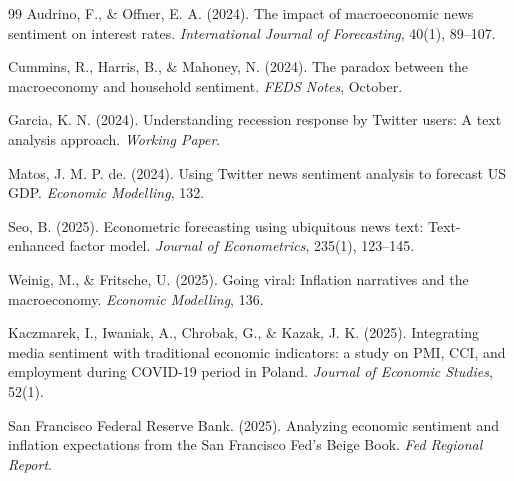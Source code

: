 \documentclass[11pt]{article}
\begin{document}
\begin{thebibliography}{99}
 Audrino, F., \& Offner, E. A. (2024). The impact of macroeconomic news sentiment on interest rates. \textit{International Journal of Forecasting}, 40(1), 89--107.

 Cummins, R., Harris, B., \& Mahoney, N. (2024). The paradox between the macroeconomy and household sentiment. \textit{FEDS Notes}, October.

 Garcia, K. N. (2024). Understanding recession response by Twitter users: A text analysis approach. \textit{Working Paper}.

 Matos, J. M. P. de. (2024). Using Twitter news sentiment analysis to forecast US GDP. \textit{Economic Modelling}, 132.

 Seo, B. (2025). Econometric forecasting using ubiquitous news text: Text-enhanced factor model. \textit{Journal of Econometrics}, 235(1), 123--145.

 Weinig, M., \& Fritsche, U. (2025). Going viral: Inflation narratives and the macroeconomy. \textit{Economic Modelling}, 136.

 Kaczmarek, I., Iwaniak, A., Chrobak, G., \& Kazak, J. K. (2025). Integrating media sentiment with traditional economic indicators: a study on PMI, CCI, and employment during COVID-19 period in Poland. \textit{Journal of Economic Studies}, 52(1).

 San Francisco Federal Reserve Bank. (2025). Analyzing economic sentiment and inflation expectations from the San Francisco Fed's Beige Book. \textit{Fed Regional Report}.

\end{thebibliography}
\end{document}
